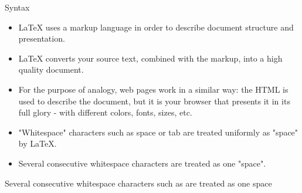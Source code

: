 \documentclass[style=lehigh,orient=landscape]{powerdot}
\begin{document}
\begin{wideslide}[bm={Syntax},method=file]{Syntax}
  \begin{itemize}
  \item LaTeX uses a markup language in order to describe document structure and presentation.
  \item LaTeX converts your source text, combined with the markup, into a high quality document.
  \item For the purpose of analogy, web pages work in a similar way: the HTML is used to describe the document, but it is your browser that presents it in its full glory - with different colors, fonts, sizes, etc.
  \item "Whitespace" characters such as space or tab are treated uniformly as "space" by LaTeX.
  \item Several consecutive whitespace characters are treated as one "space".
  \end{itemize}	
  \begin{LTXexample}[numbers=none,showspaces=true,pos=b]
Several consecutive whitespace characters such as          are treated as one space
  \end{LTXexample}
\end{wideslide}
\end{document}
